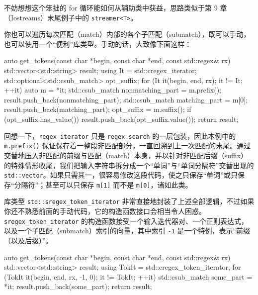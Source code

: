 不妨想想这个笨拙的 for 循环能如何从辅助类中获益，思路类似于第 9 章（Iostreams）末尾例子中的 \texttt{streamer<\allowbreak{}T>\allowbreak{}}。

你也可以遍历每次匹配（match）内部的各个子匹配（submatch），既可以手动，也可以使用一个“便利”库类型。手动的话，大致像下面这样：

\begin{codebox}[cpp]
    auto get_tokens(const char *begin, const char *end,
      const std::regex& rx)
    {
      std::vector<std::string> result;
      using It = std::cregex_iterator;
      std::optional<std::csub_match> opt_suffix;
      for (It it(begin, end, rx); it != It{}; ++it) {
        auto m = *it;
        std::csub_match nonmatching_part = m.prefix();
        result.push_back(nonmatching_part);
        std::csub_match matching_part = m[0];
        result.push_back(matching_part);
        opt_suffix = m.suffix();
      }
      if (opt_suffix.has_value()) {
        result.push_back(opt_suffix.value());
      }
      return result;
    }
\end{codebox}

回想一下，\texttt{regex\_\allowbreak{}iterator} 只是 \texttt{regex\_\allowbreak{}search} 的一层包装，因此本例中的 \texttt{m.\allowbreak{}prefix(\allowbreak{})\allowbreak{}} 保证保存着一整段非匹配部分，一直回溯到上一次匹配的末尾。通过交替地压入非匹配的前缀与匹配（match）本身，并以针对非匹配后缀（suffix）的特殊情形收尾，我们把输入字符串拆分成一个“单词”与“单词分隔符”交替出现的 \texttt{std::\allowbreak{}vector}。如果只需其一，很容易修改这段代码，使之只保存“单词”或只保存“分隔符”；甚至可以只保存 \texttt{m[1]} 而不是 \texttt{m[0]}，诸如此类。

库类型 \texttt{std::\allowbreak{}sregex\_\allowbreak{}token\_\allowbreak{}iterator} 非常直接地封装了上述全部逻辑，不过如果你还不熟悉前面的手动代码，它的构造函数接口会相当令人困惑。\texttt{sregex\_\allowbreak{}token\_\allowbreak{}iterator} 的构造函数接受一个输入迭代器对、一个正则表达式，以及一个子匹配（submatch）索引的向量，其中索引 \texttt{-1} 是一个特例，表示“前缀（以及后缀）”。

\begin{codebox}[cpp]
    auto get_tokens(const char *begin, const char *end,
      const std::regex& rx)
    {
      std::vector<std::string> result;
      using TokIt = std::cregex_token_iterator;
      for (TokIt it(begin, end, rx, {-1, 0}); it != TokIt{}; ++it) {
        std::csub_match some_part = *it;
        result.push_back(some_part);
      }
      return result;
    }
\end{codebox}

